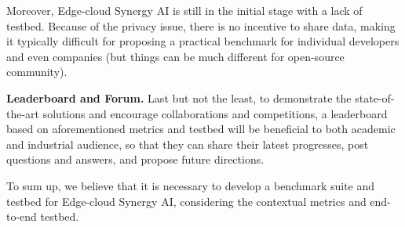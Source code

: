 Moreover, Edge-cloud Synergy AI is still in the initial stage with a lack of testbed. Because of the privacy issue, there is no incentive to share data, making it typically difficult for proposing a practical benchmark for individual developers and even companies (but things can be much different for open-source community).  

\textbf{Leaderboard and Forum.} Last but not the least, to demonstrate the state-of-the-art solutions and encourage  collaborations and competitions, a leaderboard based on aforementioned  metrics and testbed will be beneficial to both academic and industrial audience, so that they can share their latest progresses, post questions and answers,  and propose future directions.

To sum up, we believe that it is necessary to develop a benchmark suite and testbed for Edge-cloud Synergy AI, considering the contextual metrics and end-to-end testbed.
